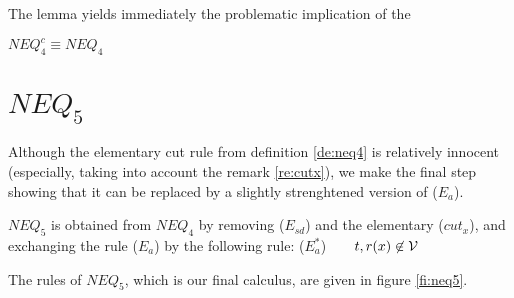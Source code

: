

The lemma yields immediately the problematic implication of the 
\begin{THEOREM}\label{th:neq4cisneq4}
 $NEQ_4^c \equiv NEQ_4$ \end{THEOREM}

\section{$NEQ_5$}
Although the elementary cut rule  from definition \ref{de:neq4}
is relatively innocent (especially, taking into account the remark
\ref{re:cutx}), we make the final step showing that it can be replaced by a
slightly strenghtened version of ($E_a$).
\begin{DEFINITION}\label{de:neq5}
 $NEQ_5$ is obtained from $NEQ_4$ by removing ($E_{sd}$) and the elementary
 ($cut_x$), and exchanging the rule ($E_a$) by the following rule:
 ($E_a^*$)\ \ \ \ $t,r(x)\not\in{\cal V}$
\end{DEFINITION}
The rules of $NEQ_5$, which is our final calculus, are given in figure \ref{fi:neq5}.

